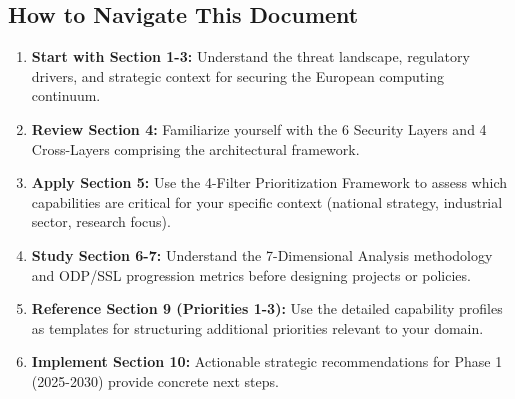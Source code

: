 \documentclass[12pt,a4paper]{article}
\begin{document}
\subsection*{How to Navigate This Document}
\begin{enumerate}
    \item \textbf{Start with Section 1-3:} Understand the threat landscape, regulatory drivers, and strategic context for securing the European computing continuum.
    
    \item \textbf{Review Section 4:} Familiarize yourself with the 6 Security Layers and 4 Cross-Layers comprising the architectural framework.
    
    \item \textbf{Apply Section 5:} Use the 4-Filter Prioritization Framework to assess which capabilities are critical for your specific context (national strategy, industrial sector, research focus).
    
    \item \textbf{Study Section 6-7:} Understand the 7-Dimensional Analysis methodology and ODP/SSL progression metrics before designing projects or policies.
    
    \item \textbf{Reference Section 9 (Priorities 1-3):} Use the detailed capability profiles as templates for structuring additional priorities relevant to your domain.
    
    \item \textbf{Implement Section 10:} Actionable strategic recommendations for Phase 1 (2025-2030) provide concrete next steps.
\end{enumerate}
\end{document}
